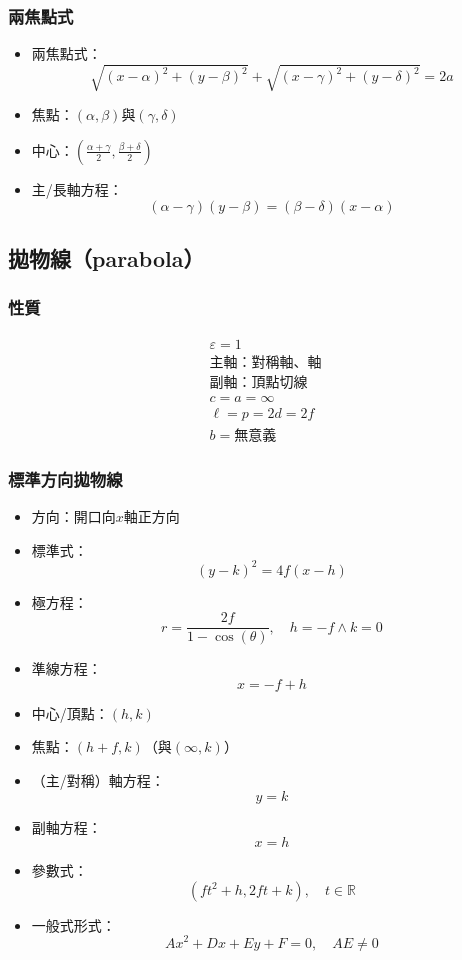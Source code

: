\documentclass[a4paper,12pt]{report}
\begin{document}
\subsubsection{兩焦點式}
\begin{itemize}
\item 兩焦點式：
\[\sqrt{(x-\alpha)^2+(y-\beta)^2}+\sqrt{(x-\gamma)^2+(y-\delta)^2}=2a\]
\item 焦點：$(\alpha,\beta)$與$(\gamma,\delta)$
\item 中心：$\left(\frac{\alpha+\gamma}{2},\frac{\beta+\delta}{2}\right)$
\item 主/長軸方程：
\[(\alpha-\gamma)(y-\beta)=(\beta-\delta)(x-\alpha)\]
\end{itemize}
\subsection{拋物線（parabola）}
\subsubsection{性質}
\[\begin{aligned}
&\varepsilon=1\\
&\text{主軸：對稱軸、軸}\\
&\text{副軸：頂點切線}\\
&c=a=\infty\\
&\ell=p=2d=2f\\
&b=\text{無意義}
\end{aligned}\]
\subsubsection{標準方向拋物線}
\begin{itemize}
\item 方向：開口向$x$軸正方向
\item 標準式：
\[(y-k)^2=4f(x-h)\]
\item 極方程：
\[r=\frac{2f}{1-\cos(\theta)},\quad h=-f\land k=0\]
\item 準線方程：
\[x=-f+h\]
\item 中心/頂點：$(h,k)$
\item 焦點：$(h+f,k)$（與$(\infty,k)$）
\item （主/對稱）軸方程：
\[y=k\]
\item 副軸方程：
\[x=h\]
\item 參數式：
\[(ft^2+h,2ft+k),\quad t\in\mathbb{R}\]
\item 一般式形式：
\[Ax^2+Dx+Ey+F=0,\quad AE\neq 0\]
\end{itemize}
\end{document}

